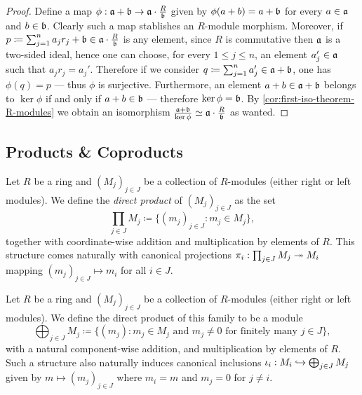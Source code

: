 \begin{proof}
Define a map
\(\phi: \mathfrak{a} + \mathfrak{b} \to \mathfrak{a} \cdot \frac{R}{\mathfrak{b}}\) given by
\(\phi(a + b) = a + \mathfrak{b}\) for every \(a \in \mathfrak{a}\) and
\(b \in \mathfrak{b}\). Clearly such a map stablishes an \(R\)-module
morphism. Moreover, if
\(p \coloneq \sum_{j=1}^n a_j r_j + \mathfrak{b} \in \mathfrak{a} \cdot
\frac{R}{\mathfrak{b}}\) is any element, since \(R\) is commutative then
\(\mathfrak{a}\) is a two-sided ideal, hence one can choose, for every
\(1 \leq j \leq n\), an element \(a_j' \in \mathfrak{a}\) such that
\(a_j r_j = a_j'\). Therefore if we consider
\(q \coloneq \sum_{j=1}^n a_j' \in \mathfrak{a} + \mathfrak{b}\), one has
\(\phi(q) = p\) --- thus \(\phi\) is surjective. Furthermore, an element
\(a + b \in \mathfrak{a} + \mathfrak{b}\) belongs to \(\ker \phi\) if and only if
\(a + b \in \mathfrak{b}\) --- therefore \(\ker \phi = \mathfrak{b}\). By
\cref{cor:first-iso-theorem-R-modules} we obtain an isomorphism
\(\frac{\mathfrak{a} + \mathfrak{b}}{\ker \phi} \simeq \mathfrak{a} \cdot
\frac{R}{\mathfrak{b}}\) as wanted.
\end{proof}

\subsection{Products \& Coproducts}

\begin{definition}
\label{def:direct-product-modules}
Let \(R\) be a ring and \((M_j)_{j \in J}\) be a collection of \(R\)-modules
(either right or left modules). We define the \emph{direct product} of
\((M_j)_{j \in J}\) as the set
\[
\prod_{j \in J} M_j \coloneq \{(m_j)_{j \in J} \colon m_j \in M_j\},
\]
together with coordinate-wise addition and multiplication by elements of
\(R\). This structure comes naturally with canonical projections
\(\pi_i: \prod_{j \in J} M_j \twoheadrightarrow M_i\) mapping \((m_j)_{j \in J} \mapsto m_i\)
for all \(i \in J\).
\end{definition}

\begin{definition}
\label{def:direct-sum-modules}
Let \(R\) be a ring and \((M_j)_{j \in J}\) be a collection of \(R\)-modules
(either right or left modules). We define the direct product of this family to
be a module
\[
\bigoplus_{j \in J} M_j \coloneq
\{(m_j) \colon m_j \in M_j \text{ and } m_j \neq 0
\text{ for finitely many } j \in J\},
\]
with a natural component-wise addition, and multiplication by elements of
\(R\). Such a structure also naturally induces canonical inclusions \(\iota_i:
M_i \hookrightarrow \bigoplus_{j \in J} M_j\) given by \(m \mapsto (m_j)_{j \in J}\)
where \(m_i = m\) and \(m_j = 0\) for \(j \neq i\).
\end{definition}

